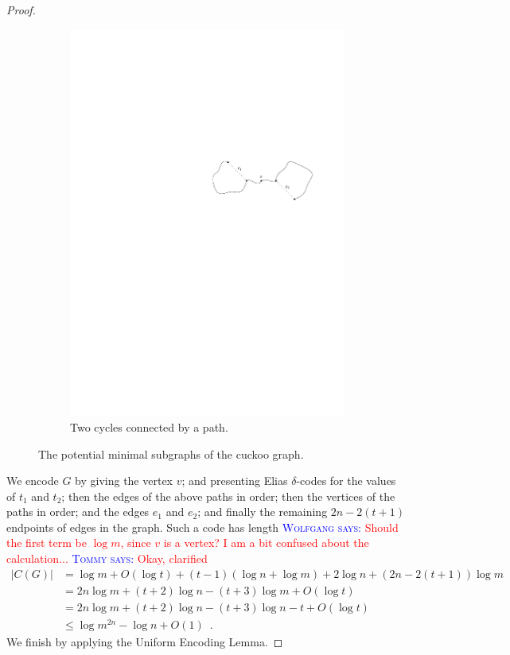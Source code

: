 \documentclass{patmorin}
\newcommand{\aremark}[3]{\textcolor{blue}{\textsc{#1 #2:}}
  \textcolor{red}{\textsf{#3}}}
\newcommand{\tommy}[2][says]{\aremark{Tommy}{#1}{#2}}
\newcommand{\wolfgang}[2][says]{\aremark{Wolfgang}{#1}{#2}}
\begin{document}
\begin{proof}
\begin{figure}
\begin{subfigure}[b]{0.6\textwidth}
      \includegraphics{cuckoo2}
      \caption{Two cycles connected by a path.}
    \end{subfigure}
    \caption{The potential minimal subgraphs of the cuckoo graph.}
  \end{figure}

  We encode $G$ by giving the vertex $v$; and presenting Elias
  $\delta$-codes for the values of $t_1$ and $t_2$; then the edges of
  the above paths in order; then the vertices of the paths in order;
  and the edges $e_1$ and $e_2$; and finally the remaining $2n - 2(t +
  1)$ endpoints of edges in the graph. Such a code has length
  \wolfgang{Should the first term be $\log m$, since $v$ is a vertex?
    I am a bit confused about the calculation...} \tommy{Okay, clarified}
  \begin{align*}
    |C(G)| &= \log m + O(\log t) + (t - 1)(\log n + \log m) + 2\log n + (2n - 2(t + 1))\log m \\
           &= 2n \log m + (t + 2) \log n - (t + 3) \log m + O(\log t) \\
           &= 2n \log m + (t + 2) \log n - (t + 3) \log n - t + O(\log t) \tag{since $m = 2n$} \\
           &\le \log m^{2n} - \log n + O(1) \enspace .
  \end{align*}
  We finish by applying the Uniform Encoding Lemma.
\end{proof}
\end{document}
